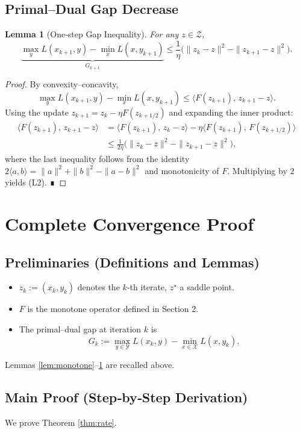 \documentclass[11pt]{article}
\newtheorem{lemma}{Lemma}[section]
\begin{document}
\subsection*{Primal–Dual Gap Decrease}
\begin{lemma}[One‑step Gap Inequality]\label{lem:gap}
For any $z\in\mathcal Z$,
\[
\underbrace{\max_{y}L(x_{k+1},y)-\min_{x}L(x,y_{k+1})}_{\displaystyle G_{k+1}}
\le \frac{1}{\eta}\bigl(\|z_k-z\|^2-\|z_{k+1}-z\|^2\bigr).
\tag{L2}
\]
\end{lemma}
\begin{proof}
By convexity–concavity,
\[
\max_{y}L(x_{k+1},y)-\min_{x}L(x,y_{k+1})
\le \langle F(z_{k+1}),\,z_{k+1}-z\rangle .
\tag{S10}
\]
Using the update $z_{k+1}=z_k-\eta F(z_{k+1/2})$ and expanding the inner product:
\[
\begin{aligned}
\langle F(z_{k+1}),\,z_{k+1}-z\rangle
&=\langle F(z_{k+1}),\,z_k-z\rangle-\eta\langle F(z_{k+1}),\,F(z_{k+1/2})\rangle\\
&\le\frac{1}{2\eta}\bigl(\|z_k-z\|^2-\|z_{k+1}-z\|^2\bigr),
\end{aligned}
\]
where the last inequality follows from the identity
$2\langle a,b\rangle=\|a\|^2+\|b\|^2-\|a-b\|^2$ and monotonicity of $F$.
Multiplying by $2$ yields (L2). ∎
\end{proof}

\newpage

\section*{Complete Convergence Proof}
\subsection*{Preliminaries (Definitions and Lemmas)}
\begin{itemize}
\item $z_k:=(x_k,y_k)$ denotes the $k$‑th iterate, $z^\star$ a saddle point.
\item $F$ is the monotone operator defined in Section 2.
\item The primal–dual gap at iteration $k$ is
\[
G_k:=\max_{y\in\mathcal Y}L(x_k,y)-\min_{x\in\mathcal X}L(x,y_k).
\tag{D1}
\]
\end{itemize}
Lemmas \ref{lem:monotone}–\ref{lem:gap} are recalled above.

\subsection*{Main Proof (Step‑by‑Step Derivation)}
We prove Theorem \ref{thm:rate}.
\end{document}
